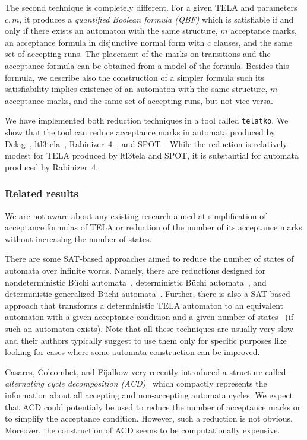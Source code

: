\documentclass[a4paper,UKenglish,cleveref, autoref, thm-restate]{lipics-v2021}
\begin{document}
The second technique is completely different. For a given TELA and
parameters $c,m$, it produces a \emph{quantified Boolean formula
  (QBF)} which is satisfiable if and only if there exists an automaton
with the same structure, $m$ acceptance marks, an acceptance formula
in disjunctive normal form with $c$ clauses, and the same set
of accepting runs. The placement of the marks on transitions and the
acceptance formula can be obtained from a model of the
formula. Besides this formula, we describe also the construction of a
simpler formula such its satisfiability implies existence of an
automaton with the same structure, $m$ acceptance marks, and the same
set of accepting runs, but not vice versa.

We have implemented both reduction techniques in a tool called
\texttt{telatko}. We show that the tool can reduce acceptance marks in
automata produced by Delag~\cite{muller.17.gandalf},
ltl3tela~\cite{major.19.atva}, Rabinizer~4~\cite{kretinsky.18.cav},
and SPOT~\cite{duret.16.atva2}.  While the reduction is relatively
modest for TELA produced by ltl3tela and SPOT, it is substantial for
automata produced by Rabinizer~4.

\subsubsection{Related results}
We are not aware about any existing research aimed at simplification
of acceptance formulas of TELA or reduction of the number of its
acceptance marks without increasing the number of states.

There are some SAT-based approaches aimed to reduce the number of
states of automata over infinite words. Namely, there are reductions
designed for nondeterministic Büchi automata~\cite{ehlers.10.spin},
deterministic Büchi automata~\cite{ehlers.10.sat}, and deterministic
generalized Büchi automata~\cite{baarir.14.forte}. Further, there is
also a SAT-based approach that transforms a deterministic TELA
automaton to an equivalent automaton with a given acceptance condition
and a given number of states~\cite{baarir.15.lpar} (if such an
automaton exists). Note that all these techniques are usually very
slow and their authors typically suggest to use them only for specific
purposes like looking for cases where some automata construction can
be improved.

Casares, Colcombet, and Fijalkow very recently introduced a structure
called \emph{alternating cycle decomposition
  (ACD)}~\cite{casares.21.icalp} which compactly represents the
information about all accepting and non-accepting automata cycles.  We
expect that ACD could potentialy be used to reduce the number of
acceptance marks or to simplify the acceptance condition. However,
such a reduction is not obvious. Moreover, the construction of ACD
seems to be computationally expensive.
\end{document}
